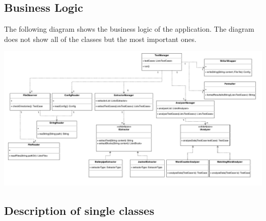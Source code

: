 \begin{landscape}

\subsection{Business Logic}
\label{subsec:Business Logic}

The following diagram shows the business logic of the application. The diagram does not show all of the classes but the most important ones. 

\includegraphics[width=23cm]{Figures/architecutre.pdf}


\end{landscape}



\pagebreak
\subsection{Description of single classes}

